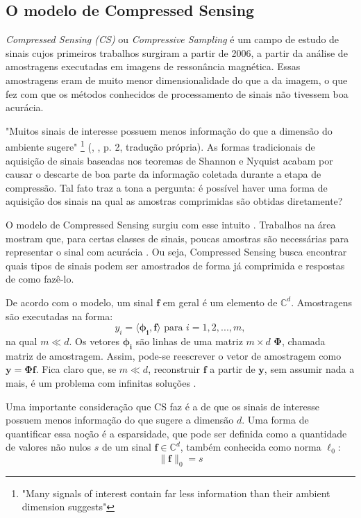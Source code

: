 \documentclass[cic,tc]{iiufrgs}
\renewcommand{\vec}[1]{\bm{#1}}
\begin{document}
\subsection{O modelo de Compressed Sensing}
\textit{Compressed Sensing (CS)} ou \textit{Compressive Sampling} é um campo de estudo de sinais cujos
primeiros trabalhos surgiram a partir de 2006, a partir da análise de amostragens executadas em imagens de 
ressonância magnética. Essas amostragens eram de muito menor dimensionalidade do que a da imagem, o que 
fez com que os métodos conhecidos de processamento de sinais não tivessem boa acurácia.

"Muitos sinais de interesse possuem menos informação do que a dimensão do ambiente sugere"
\footnote{"Many signals of interest contain far less information than their ambient dimension suggests"}
(\citeauthor{chen2015compressed}, \citeyear{chen2015compressed}, p. 2, tradução própria).
As formas tradicionais de aquisição de sinais baseadas nos teoremas de Shannon e Nyquist acabam por causar o descarte
de boa parte da informação coletada durante a etapa de compressão. Tal fato traz a tona a pergunta: é possível haver 
uma forma de aquisição dos sinais na qual as amostras comprimidas são obtidas diretamente? 

O modelo de Compressed Sensing surgiu com esse intuito \cite{DonohoCS}. Trabalhos na área mostram que, para certas classes
de sinais, poucas amostras são necessárias para representar o sinal com acurácia \cite{chen2015compressed}.
Ou seja, Compressed Sensing busca encontrar quais tipos
de sinais podem ser amostrados de forma já comprimida e respostas de como fazê-lo.

De acordo com o modelo, um sinal $ \vec{f} $ em geral é um elemento de $ \mathbb{C}^d $. Amostragens são executadas na forma:
\begin{equation}
    y_i = \langle \vec{\phi_i}, \vec{f} \rangle \text{ para } i=1,2,...,m, 
\end{equation}
na qual $m \ll d$. Os vetores $\vec{\phi_i}$ são linhas de uma matriz $m \times d$ $\mathbf{\Phi}$, chamada matriz 
de amostragem. Assim, pode-se reescrever o vetor de amostragem como $\vec{y} = \mathbf{\Phi} \vec{f}$. Fica claro que, 
se $ m \ll d$, reconstruir $\vec{f}$ a partir de $\vec{y}$, sem assumir nada a mais, é um problema 
com infinitas soluções \cite{chen2015compressed}.

Uma importante consideração que CS faz é a de que os sinais de interesse possuem menos informação do que sugere a 
dimensão $d$. Uma forma de quantificar essa noção é a esparsidade, que pode ser definida como a quantidade de valores não
nulos $s$ de um sinal $\vec{f} \in \mathbb{C}^d$, também conhecida como norma $\ell_0$:
\begin{equation}
    \lVert \vec{f} \rVert_0 = s
\end{equation}
\end{document}
